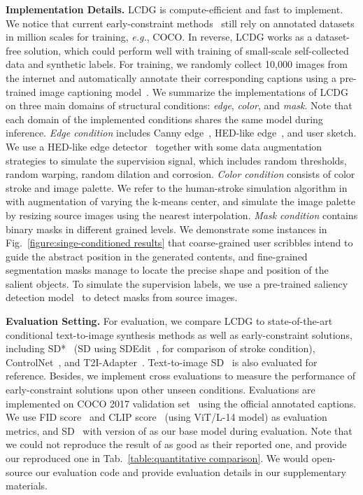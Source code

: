 \documentclass{article}
\begin{document}
\textbf{Implementation Details.} LCDG is compute-efficient and fast to implement. We notice that current early-constraint methods~\cite{mou2023t2i, zhang2023adding} still rely on annotated datasets in million scales for training, \textit{e.g.}, COCO. In reverse, LCDG works as a dataset-free solution, which could perform well with training of small-scale self-collected data and synthetic labels. For training, we randomly collect 10,000 images from the internet and automatically annotate their corresponding captions using a pre-trained image captioning model~\cite{hu2022expansionnet}. We summarize the implementations of LCDG on three main domains of structural conditions: \textit{edge}, \textit{color}, and \textit{mask}. Note that each domain of the implemented conditions shares the same model during inference. \textit{Edge condition} includes Canny edge~\cite{canny1986computational}, HED-like edge~\cite{xie2015holistically}, and user sketch. We use a HED-like edge detector~\cite{he2020bdcn} together with some data augmentation strategies to simulate the supervision signal, which includes random thresholds, random warping, random dilation and corrosion. \textit{Color condition} consists of color stroke and image palette. We refer to the human-stroke simulation algorithm in~\cite{meng2021sdedit} with augmentation of varying the k-means center, and simulate the image palette by resizing source images using the nearest interpolation. \textit{Mask condition} contains binary masks in different grained levels. We demonstrate some instances in Fig.~\ref{figure:singe-conditioned results} that coarse-grained user scribbles intend to guide the abstract position in the generated contents, and fine-grained segmentation masks manage to locate the precise shape and position of the salient objects. To simulate the supervision labels, we use a pre-trained saliency detection model~\cite{qin2020u2} to detect masks from source images.

\textbf{Evaluation Setting.} For evaluation, we compare LCDG to state-of-the-art conditional text-to-image synthesis methods as well as early-constraint solutions, including SD*~\cite{rombach2022high} (SD using SDEdit~\cite{meng2021sdedit}, for comparison of stroke condition), ControlNet~\cite{zhang2023adding}, and T2I-Adapter~\cite{mou2023t2i}. Text-to-image SD~\cite{rombach2022high} is also evaluated for reference. Besides, we implement cross evaluations to measure the performance of early-constraint solutions upon other unseen conditions. Evaluations are implemented on COCO 2017 validation set~\cite{lin2014microsoft} using the official annotated captions. We use FID score~\cite{NIPS2017_8a1d6947} and CLIP score~\cite{radford2021learning} (using ViT/L-14 model) as evaluation metrics, and SD~\cite{rombach2022high} with version of  as our base model during evaluation. Note that we could not reproduce the result of \cite{mou2023t2i} as good as their reported one, and provide our reproduced one in Tab.~\ref{table:quantitative comparison}. We would open-source our evaluation code and provide evaluation details in our supplementary materials.
\end{document}
